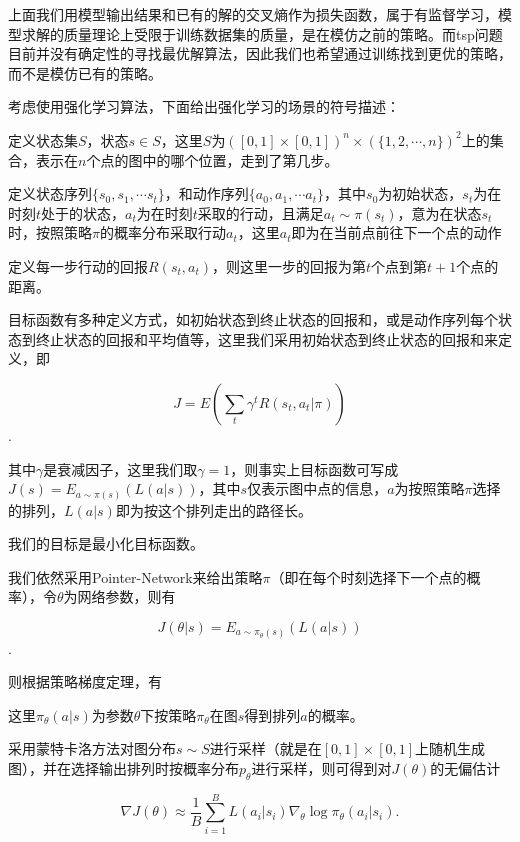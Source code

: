 \documentclass[10pt]{article}
\begin{document}
\renewcommand{\algorithmicrequire}{\textbf{输入:}}
\renewcommand{\algorithmicensure}{\textbf{输出:}}

上面我们用模型输出结果和已有的解的交叉熵作为损失函数，属于有监督学习，模型求解的质量理论上受限于训练数据集的质量，是在模仿之前的策略。而tsp问题目前并没有确定性的寻找最优解算法，因此我们也希望通过训练找到更优的策略，而不是模仿已有的策略。

考虑使用强化学习算法，下面给出强化学习的场景的符号描述：

定义状态集$S$，状态$s\in S$，这里$S$为$\left([0,1]\times[0,1]\right)^n\times\left(\{1,2,\dotsb,n\}\right)^2$上的集合，表示在$n$个点的图中的哪个位置，走到了第几步。

定义状态序列$\{s_0,s_1,\dotsb s_t\}$，和动作序列$\{a_0,a_1,\dotsb a_t\}$，其中$s_0$为初始状态，$s_t$为在时刻$t$处于的状态，$a_t$为在时刻$t$采取的行动，且满足$a_t\sim \pi\left(s_{t}\right)$，意为在状态$s_t$时，按照策略$\pi$的概率分布采取行动$a_t$，这里$a_t$即为在当前点前往下一个点的动作

定义每一步行动的回报$R\left(s_t,a_t\right)$，则这里一步的回报为第$t$个点到第$t+1$个点的距离。

目标函数有多种定义方式，如初始状态到终止状态的回报和，或是动作序列每个状态到终止状态的回报和平均值等，这里我们采用初始状态到终止状态的回报和来定义，即

$$J=E\left(\sum_t\gamma^tR\left(s_t,a_t|\pi\right)\right)$$.

其中$\gamma$是衰减因子，这里我们取$\gamma=1$，则事实上目标函数可写成$J\left(s\right)=E_{a\sim \pi\left(s\right)}\left(L\left(a|s\right)\right)$，其中$s$仅表示图中点的信息，$a$为按照策略$\pi$选择的排列，$L\left(a|s\right)$即为按这个排列走出的路径长。

我们的目标是最小化目标函数。

我们依然采用Pointer-Network来给出策略$\pi$（即在每个时刻选择下一个点的概率），令$\theta$为网络参数，则有

$$J\left(\theta |s\right)=E_{a\sim \pi_\theta\left(s\right)}\left(L\left(a|s\right)\right)$$.

则根据策略梯度定理，有

这里$\pi_\theta\left(a|s\right)$为参数$\theta$下按策略$\pi_\theta$在图$s$得到排列$a$的概率。

采用蒙特卡洛方法对图分布$s\sim S$进行采样（就是在$[0,1]\times[0,1]$上随机生成图），并在选择输出排列时按概率分布$p_\theta$进行采样，则可得到对$J\left(\theta\right)$的无偏估计

$$\nabla J\left(\theta\right)\approx \dfrac{1}{B}\sum_{i=1}^BL\left(a_i|s_i\right)\nabla_\theta\log \pi_\theta\left(a_i|s_i\right). $$
\end{document}

